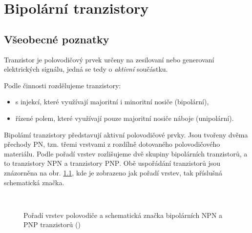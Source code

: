 \setchaptertoc
\chapter{Bipolární tranzistory}\label{es:IchapV}
  \section{Všeobecné poznatky}\label{es:IchapVsecI}
    Tranzistor je polovodičový prvek určeny na zesilovaní nebo generovaní elektrických signálu,
    jedná se tedy o \emph{aktivní} součástku.

    Podle činnosti rozdělujeme tranzistory: 
    \begin{itemize}[noitemsep]
      \item s injekcí, které využívají majoritní i minoritní nosiče (bipolární),
      \item řízené polem, které využívají pouze majoritní nosiče náboje (unipolární).
    \end{itemize}
     
    Bipolámí tranzistory představují aktivní polovodičové prvky. Jsou tvořeny dvěma přechody PN,
    tzn. třemi vrstvami z rozdílně dotovaného polovodičového materiálu. Podle pořadí vrstev
    rozlišujeme dvě skupiny bipolárních tranzistorů, a to tranzistory \textsc{NPN} a tranzistory
    \textsc{PNP}. Obě uspořádání tranzistorů jsou znázorněna na obr. \ref{teo:fig053}, kde je
    zobrazeno jak pořadí vrstev, tak příslušná schematická značka.

    \begin{figure}[ht!]
      \centering  
       \hspace{1em}
       \\
                   \hspace{1em}
      \caption{Pořadí vrstev polovodiče a schematická značka bipolárních NPN a PNP 
      tranzistorů (\cite[s.~112]{Frohn2006})}
      \label{teo:fig053}
    \end{figure}
    
